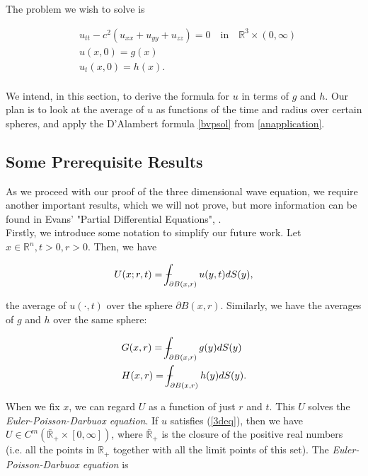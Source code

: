 \documentclass[12pt]{article}
\def\Xint#1{\mathchoice
{\XXint\displaystyle\textstyle{#1}}%
{\XXint\textstyle\scriptstyle{#1}}%
{\XXint\scriptstyle\scriptscriptstyle{#1}}%
{\XXint\scriptscriptstyle\scriptscriptstyle{#1}}%
\!\int}
\def\XXint#1#2#3{{\setbox0=\hbox{$#1{#2#3}{\int}$ }
\vcenter{\hbox{$#2#3$ }}\kern-.6\wd0}}
\def\dashint{\Xint-}
\numberwithin{equation}{section}
\begin{document}
The problem we wish to solve is

\begin{equation} \label{3deq}
\begin{aligned}
    &u_{tt}-c^2(u_{xx}+u_{yy}+u_{zz})=0 \quad \textrm{in} \quad \mathbb{R}^3 \times (0,\infty)\\
    &u(x,0)=g(x)\\
    &u_t(x,0)=h(x).\\
\end{aligned}
\end{equation}

We intend, in this section, to derive the formula for $u$ in terms of $g$ and $h$. Our plan is to look at the average of $u$ as 
functions of the time and radius over certain spheres, and apply the D'Alambert formula \ref{bvpsol} from \ref{anapplication}.

\subsection{Some Prerequisite Results} \label{prereq}
As we proceed with our proof of the three dimensional wave equation, we require another important results, which we will not prove, but more information
can be found in Evans' "Partial Differential Equations", \cite{Ev}.
\\

Firstly, we introduce some notation to simplify our future work. Let $x\in \mathbb{R}^n, t>0, r>0$. Then, we have

\begin{equation} \label{averageU}
    U(x;r,t)=\dashint_{\partial B(x,r)}u(y,t)dS(y),
\end{equation}

the average of $u(\cdot,t)$ over the sphere $\partial B(x,r)$. \cite{Ev} Similarly, we have the averages of $g$ and $h$ over the same sphere:

\begin{equation} \label{averageGH}
    \begin{aligned}
        &G(x,r)=\dashint_{\partial B(x,r)}g(y)dS(y)\\
        &H(x,r)=\dashint_{\partial B(x,r)}h(y)dS(y).
    \end{aligned}
\end{equation}

When we fix $x$, we can regard $U$ as a function of just $r$ and $t$. This $U$ solves the \emph{Euler-Poisson-Darbuox equation}. If $u$ satisfies
(\ref{3deq}), then we have $U \in C^m(\bar{\mathbb{R}}_+\times[0,\infty])$, where $\bar{\mathbb{R}}_+$ is the closure of the positive real numbers (i.e.
all the points in $\mathbb{R}_+$ together with all the limit points of this set). The \emph{Euler-Poisson-Darbuox equation} is
\end{document}
